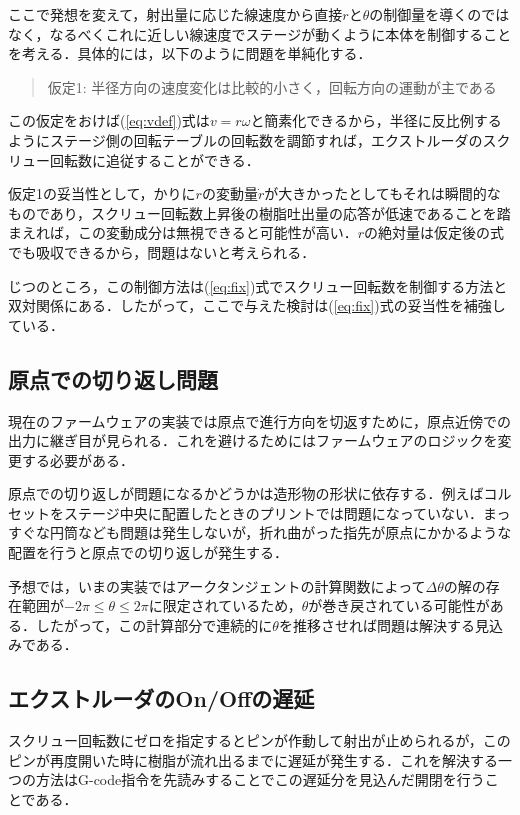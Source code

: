 \documentclass[twocolumn,oneside,a4paper]{article}
\begin{document}
ここで発想を変えて，射出量に応じた線速度から直接$r$と$\theta$の制御量を導くのではなく，なるべくこれに近しい線速度でステージが動くように本体を制御することを考える．具体的には，以下のように問題を単純化する．

\begin{quote}
	仮定1: 半径方向の速度変化は比較的小さく，回転方向の運動が主である
\end{quote}

この仮定をおけば(\ref{eq:vdef})式は$v=r \omega$と簡素化できるから，半径に反比例するようにステージ側の回転テーブルの回転数を調節すれば，エクストルーダのスクリュー回転数に追従することができる．

仮定1の妥当性として，かりに$r$の変動量$\dot{r}$が大きかったとしてもそれは瞬間的なものであり，スクリュー回転数上昇後の樹脂吐出量の応答が低速であることを踏まえれば，この変動成分は無視できると可能性が高い．$r$の絶対量は仮定後の式でも吸収できるから，問題はないと考えられる．

じつのところ，この制御方法は(\ref{eq:fix})式でスクリュー回転数を制御する方法と双対関係にある．したがって，ここで与えた検討は(\ref{eq:fix})式の妥当性を補強している．


\subsection{原点での切り返し問題}
現在のファームウェアの実装では原点で進行方向を切返すために，原点近傍での出力に継ぎ目が見られる．これを避けるためにはファームウェアのロジックを変更する必要がある．

原点での切り返しが問題になるかどうかは造形物の形状に依存する．例えばコルセットをステージ中央に配置したときのプリントでは問題になっていない．まっすぐな円筒なども問題は発生しないが，折れ曲がった指先が原点にかかるような配置を行うと原点での切り返しが発生する．

予想では，いまの実装ではアークタンジェントの計算関数によって$\Delta \theta$の解の存在範囲が$-2 \pi \leq \theta \leq  2 \pi$に限定されているため，$\theta$が巻き戻されている可能性がある．したがって，この計算部分で連続的に$\theta$を推移させれば問題は解決する見込みである．

\subsection{エクストルーダのOn/Offの遅延}
スクリュー回転数にゼロを指定するとピンが作動して射出が止められるが，このピンが再度開いた時に樹脂が流れ出るまでに遅延が発生する．これを解決する一つの方法はG-code指令を先読みすることでこの遅延分を見込んだ開閉を行うことである．
\end{document}
